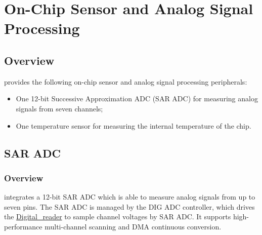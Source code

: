 \documentclass[main\_\_EN.tex]{subfiles}
\begin{document}

\ifglobal
\else
    {\let\clearpage\relax \listoftodos}
    {\let\clearpage\relax \listofdonetodos}
    \tableofcontents
\fi


\hypertarget{sensor}{}
\chapter{On-Chip Sensor and Analog Signal Processing}
\label{mod:sensor}


\section{Overview}

\chipname{} provides the following on-chip sensor and analog signal processing peripherals:

\begin{itemize}
    \item One 12-bit Successive Approximation ADC (SAR ADC) for measuring analog signals from seven channels;
    \item One temperature sensor for measuring the internal temperature of the \chipname{} chip.
\end{itemize}

\section{SAR ADC}\label{sec:sensor-sar-adc}

\subsection{Overview}

\chipname{} integrates a 12-bit SAR ADC which is able to measure analog signals from up to seven pins. The SAR ADC is managed by the DIG ADC controller, which drives the \hyperref[other:sensor-item-read-data-from-sar-adc]{Digital\_reader} to sample channel voltages by SAR ADC. It supports high-performance multi-channel scanning and DMA continuous conversion.
\end{document}
